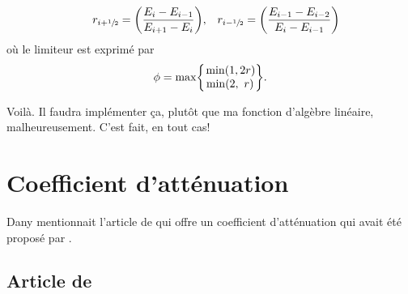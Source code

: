 \documentclass[10pt]{article}
\numberwithin{equation}{section}
\newcommand{\pt}{\hspace{1pt}} %
\begin{document}
\begin{align}
   && && &&r_{i+\sfrac{1}{2}} = \qty(\frac{E_i - E_{i-1}}{E_{i+1} - E_i}),    && r_{i-\sfrac{1}{2}} = \qty(\frac{E_{i-1} - E_{i-2}}{E_{i} - E_{i-1}}) && &&
\end{align}
où le limiteur est exprimé par
\begin{equation}
   \phi = \mathrm{max} \qty{\begin{matrix}
       \pt\mathrm{min}(1, 2r)\\
       \mathrm{min}(2,\ r)\\
   \end{matrix}
   }.
\end{equation}

Voilà. Il faudra implémenter ça, plutôt que ma fonction d'algèbre linéaire, malheureusement.
C'est fait, en tout cas!
\section{Coefficient d'atténuation}
\label{sec:orge769e47}

Dany mentionnait l'article de \Textcite{auclair2022model} qui offre un coefficient d'atténuation qui avait été proposé par \Textcite{sutherland2019two}.
\subsection{Article de \Textcite{auclair2022model}}
\label{sec:orgd2a6075}
\end{document}
